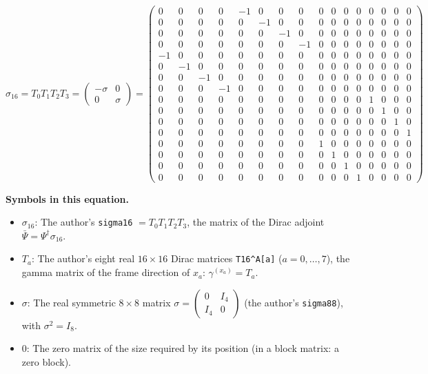 \documentclass[
  10pt,
]{article}
\providecommand{\tightlist}{%
  \setlength{\itemsep}{0pt}\setlength{\parskip}{0pt}}
\begin{document}
\[
\sigma_{16} = T_0T_1T_2T_3 = \begin{pmatrix} -\sigma & 0 \\ 0 & \sigma \end{pmatrix} = \scriptstyle \begin{pmatrix} 0 & 0 & 0 & 0 & -1 & 0 & 0 & 0 & 0 & 0 & 0 & 0 & 0 & 0 & 0 & 0 \\ 0 & 0 & 0 & 0 & 0 & -1 & 0 & 0 & 0 & 0 & 0 & 0 & 0 & 0 & 0 & 0 \\ 0 & 0 & 0 & 0 & 0 & 0 & -1 & 0 & 0 & 0 & 0 & 0 & 0 & 0 & 0 & 0 \\ 0 & 0 & 0 & 0 & 0 & 0 & 0 & -1 & 0 & 0 & 0 & 0 & 0 & 0 & 0 & 0 \\ -1 & 0 & 0 & 0 & 0 & 0 & 0 & 0 & 0 & 0 & 0 & 0 & 0 & 0 & 0 & 0 \\ 0 & -1 & 0 & 0 & 0 & 0 & 0 & 0 & 0 & 0 & 0 & 0 & 0 & 0 & 0 & 0 \\ 0 & 0 & -1 & 0 & 0 & 0 & 0 & 0 & 0 & 0 & 0 & 0 & 0 & 0 & 0 & 0 \\ 0 & 0 & 0 & -1 & 0 & 0 & 0 & 0 & 0 & 0 & 0 & 0 & 0 & 0 & 0 & 0 \\ 0 & 0 & 0 & 0 & 0 & 0 & 0 & 0 & 0 & 0 & 0 & 0 & 1 & 0 & 0 & 0 \\ 0 & 0 & 0 & 0 & 0 & 0 & 0 & 0 & 0 & 0 & 0 & 0 & 0 & 1 & 0 & 0 \\ 0 & 0 & 0 & 0 & 0 & 0 & 0 & 0 & 0 & 0 & 0 & 0 & 0 & 0 & 1 & 0 \\ 0 & 0 & 0 & 0 & 0 & 0 & 0 & 0 & 0 & 0 & 0 & 0 & 0 & 0 & 0 & 1 \\ 0 & 0 & 0 & 0 & 0 & 0 & 0 & 0 & 1 & 0 & 0 & 0 & 0 & 0 & 0 & 0 \\ 0 & 0 & 0 & 0 & 0 & 0 & 0 & 0 & 0 & 1 & 0 & 0 & 0 & 0 & 0 & 0 \\ 0 & 0 & 0 & 0 & 0 & 0 & 0 & 0 & 0 & 0 & 1 & 0 & 0 & 0 & 0 & 0 \\ 0 & 0 & 0 & 0 & 0 & 0 & 0 & 0 & 0 & 0 & 0 & 1 & 0 & 0 & 0 & 0 \end{pmatrix}
\]

\textbf{Symbols in this equation.}

\begin{itemize}
\tightlist
\item
  \(\sigma_{16}\): The author's \texttt{sigma16} \(= T_0 T_1 T_2 T_3\),
  the matrix of the Dirac adjoint
  \(\bar\Psi = \Psi^\dagger\sigma_{16}\).
\item
  \(T_a\): The author's eight real \(16 \times 16\) Dirac matrices
  \texttt{T16\^{}A{[}a{]}} (\(a = 0, \dots, 7\)), the gamma matrix of
  the frame direction of \(x_a\): \(\gamma^{(x_a)} = T_a\).
\item
  \(\sigma\): The real symmetric \(8 \times 8\) matrix
  \(\sigma = \begin{pmatrix} 0 & I_4 \\ I_4 & 0 \end{pmatrix}\) (the
  author's \texttt{sigma88}), with \(\sigma^2 = I_8\).
\item
  \(0\): The zero matrix of the size required by its position (in a
  block matrix: a zero block).
\end{itemize}
\end{document}
